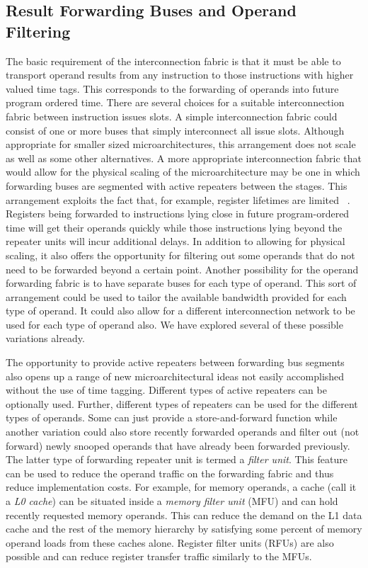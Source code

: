 \documentclass[10pt,dvips]{article}
\begin{document}
\subsection{Result Forwarding Buses and Operand Filtering}
%
The basic requirement of the interconnection fabric is that it must be able
to transport operand results from any instruction to those
instructions with higher valued time tags.  This corresponds
to the forwarding of operands into future program ordered time.
There are several choices for a suitable interconnection fabric between
instruction issues slots.
A simple interconnection fabric could consist of one or more
buses that simply interconnect all issue slots.
Although appropriate for smaller sized microarchitectures,
this arrangement does not scale as well as some other alternatives.
A more appropriate interconnection fabric that would allow
for the physical scaling of the microarchitecture may be one in which
forwarding buses are segmented with active repeaters between
the stages.
This arrangement exploits the fact that, for example, register lifetimes
are limited ~\cite{Franklin92,Sohi95}.
Registers being forwarded to instructions lying close
in future program-ordered time will get their operands quickly
while those instructions lying beyond the repeater units
will incur additional delays.
In addition to allowing for physical scaling, it also offers
the opportunity for filtering out some operands that do
not need to be forwarded beyond a certain point.
Another possibility for the operand forwarding fabric is
to have separate buses for each type of operand.
This sort of arrangement could be used to tailor the available
bandwidth provided for each type of operand.  It could also
allow for a different interconnection network to be used
for each type of operand also.  We have explored several of
these possible variations already.

The opportunity to provide active repeaters between forwarding bus
segments also opens up a range of new microarchitectural
ideas not easily accomplished without the use of time tagging.
Different types of active repeaters can be optionally used.
Further, different types of repeaters can be used for
the different types of operands.
Some can just provide a store-and-forward function while
another variation could also store recently forwarded operands
and filter out (not forward) newly snooped operands that
have already been forwarded previously. 
The latter type of forwarding repeater unit is termed a
\textit{filter unit}.
This feature can be used to reduce the operand traffic
on the forwarding fabric and thus reduce implementation costs.
For example, for memory operands, a cache (call it a \textit{L0 cache})
can be situated inside a \textit{memory filter unit} (MFU)
and can hold recently requested memory operands.
This can reduce the demand on the L1 data cache and the rest
of the memory hierarchy by satisfying some percent of memory
operand loads from these caches alone.
Register filter units (RFUs) are also possible and can reduce
register transfer traffic similarly to the MFUs.
%
%
\end{document}
